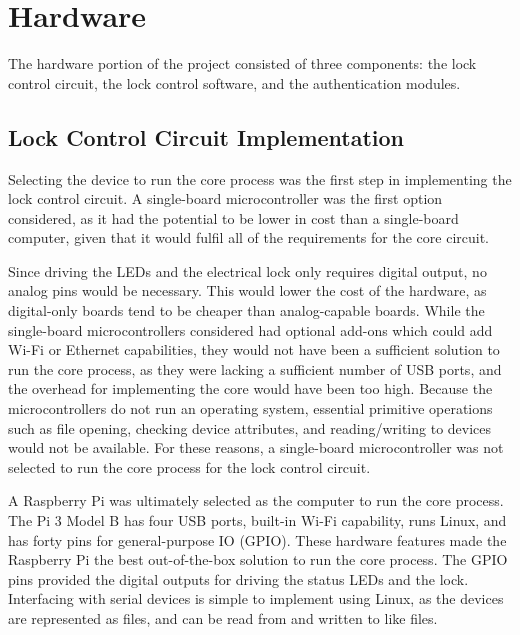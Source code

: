 \documentclass[12pt]{report}
\let\Oldsection\section
\renewcommand{\section}{\FloatBarrier\Oldsection}
\let\Oldsubsection\subsection
\renewcommand{\subsection}{\FloatBarrier\Oldsubsection}
\begin{document}

\section{Hardware} \label{hardware}

The hardware portion of the project consisted of three components: the lock control circuit, the lock control software, 
and the authentication modules.

\subsection{Lock Control Circuit Implementation} \label{section:lock-control-circuit-implementation}

Selecting the device to run the core process was the first step in implementing the lock control circuit. A 
single-board microcontroller was the first option considered, as it had the potential to be lower in cost than a 
single-board computer, given that it would fulfil all of the requirements for the core circuit.

Since driving the LEDs and the electrical lock only requires digital output, no analog pins would be necessary. This 
would lower the cost of the hardware, as digital-only boards tend to be cheaper than analog-capable boards. While 
the single-board microcontrollers considered had optional add-ons which could add Wi-Fi or Ethernet capabilities, they 
would not have been a sufficient solution to run the core process, as they were lacking a sufficient number of USB 
ports, and the overhead for implementing the core would have been too high. Because the microcontrollers do not run an 
operating system, essential primitive operations such as file opening, checking device attributes, and reading/writing
to devices would not be available. For these reasons, a single-board microcontroller was not selected to run the core 
process for the lock control circuit.

A Raspberry Pi was ultimately selected as the computer to run the core process. The Pi 3 Model B has four USB ports, 
built-in Wi-Fi capability, runs Linux, and has forty pins for general-purpose IO (GPIO). These hardware features made the
Raspberry Pi the best out-of-the-box solution to run the core process. The GPIO pins provided the digital outputs for 
driving the status LEDs and the lock. Interfacing with serial devices is simple to implement using Linux, as the devices 
are represented as files, and can be read from and written to like files.
\end{document}
